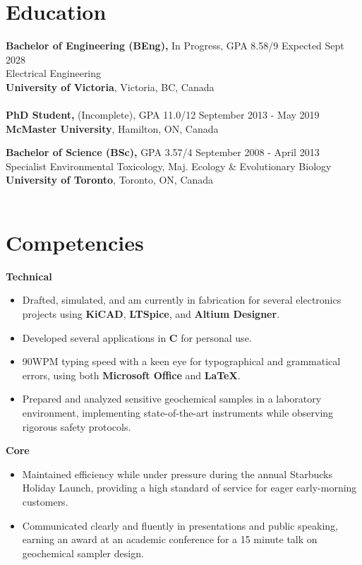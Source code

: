 \documentclass[line,margin]{res}
\newcommand{\CC}{C\nolinebreak\hspace{-.05em}\raisebox{.4ex}{\tiny\bf +}\nolinebreak\hspace{-.10em}\raisebox{.4ex}{\tiny\bf +}}
\begin{document}
\address{203-1870 McKenzie Avenue, Victoria BC V8N 4X3}
\address{\href{mailto:mwinlandgaetz@gmail.com}{mwinlandgaetz@gmail.com}\\
(289) 689-0427}

\begin{resume}
\section{Education}
    {\textbf{Bachelor of Engineering (BEng),}} In Progress, GPA 8.58/9 \hfill Expected Sept 2028\\
    Electrical Engineering\\
    \textbf{University of Victoria}, Victoria, BC, Canada \\\\
    \textbf{PhD Student,} (Incomplete), GPA 11.0/12   \hfill September 2013 - May 2019\\
    \textbf{McMaster University}, Hamilton, ON, Canada \hfill 

    {\textbf{Bachelor of Science (BSc),}} GPA 3.57/4 \hfill September 2008 - April 2013\\
    Specialist Environmental Toxicology, Maj. Ecology \& Evolutionary Biology\\
    \textbf{University of Toronto}, Toronto, ON, Canada \\\\


\section{Competencies}
    \textbf{Technical}
    \begin{itemize} \itemsep -2pt
        \item Drafted, simulated, and am currently in fabrication for several electronics projects using \textbf{KiCAD}, \textbf{LTSpice}, and \textbf{Altium Designer}.
        \item Developed several applications in \textbf{\CC} for personal use.
        \item 90WPM typing speed with a keen eye for typographical and grammatical errors, using both \textbf{Microsoft Office} and \textbf{LaTeX}.
        \item Prepared and analyzed sensitive geochemical samples in a laboratory environment, implementing state-of-the-art instruments while observing rigorous safety protocols.
    \end{itemize}
    \textbf{Core}
    \begin{itemize} \itemsep -2pt
        \item Maintained efficiency while under pressure during the annual Starbucks Holiday Launch, providing a high standard of service for eager early-morning customers.
        \item Communicated clearly and fluently in presentations and public speaking, earning an award at an academic conference for a 15 minute talk on geochemical sampler design.
    \end{itemize}


\end{resume}
\end{document}
